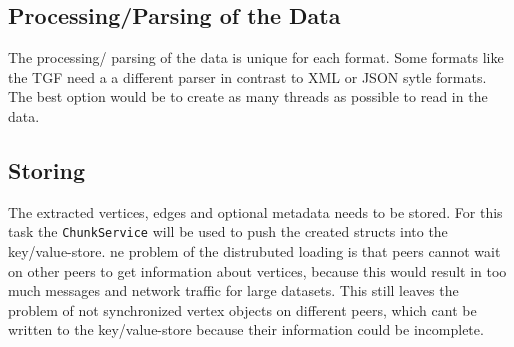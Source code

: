 \subsection{Processing/Parsing of the Data}
The processing/ parsing of the data is unique for each format. Some formats like the TGF need a a different parser in contrast to XML or JSON sytle formats. The best option would be to create as many threads as possible to read in the data.

\subsection{Storing}
The extracted vertices, edges and optional metadata needs to be stored. For this task the \texttt{ChunkService} will be used to push the created structs into the key/value-store. ne problem of the distrubuted loading is that peers cannot wait on other peers to get information about vertices, because this would result in too much messages and network traffic for large datasets. This still leaves the problem of not synchronized vertex objects on different peers, which cant be written to the key/value-store because their information could be incomplete. 
